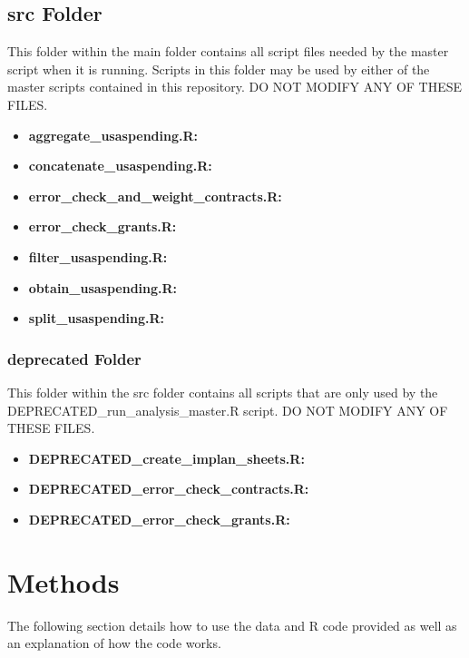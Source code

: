 \documentclass[
]{book}
\providecommand{\tightlist}{%
  \setlength{\itemsep}{0pt}\setlength{\parskip}{0pt}}
\begin{document}
\hypertarget{src-folder}{%
\section{src Folder}\label{src-folder}}

This folder within the main folder contains all script files needed by the master script when it is running. Scripts in this folder may be used by either of the master scripts contained in this repository. DO NOT MODIFY ANY OF THESE FILES.

\begin{itemize}
\tightlist
\item
  \textbf{aggregate\_usaspending.R:}
\item
  \textbf{concatenate\_usaspending.R:}
\item
  \textbf{error\_check\_and\_weight\_contracts.R:}
\item
  \textbf{error\_check\_grants.R:}
\item
  \textbf{filter\_usaspending.R:}
\item
  \textbf{obtain\_usaspending.R:}
\item
  \textbf{split\_usaspending.R:}
\end{itemize}

\hypertarget{deprecated-folder-1}{%
\subsection{deprecated Folder}\label{deprecated-folder-1}}

This folder within the src folder contains all scripts that are only used by the DEPRECATED\_run\_analysis\_master.R script. DO NOT MODIFY ANY OF THESE FILES.

\begin{itemize}
\tightlist
\item
  \textbf{DEPRECATED\_create\_implan\_sheets.R:}
\item
  \textbf{DEPRECATED\_error\_check\_contracts.R:}
\item
  \textbf{DEPRECATED\_error\_check\_grants.R:}
\end{itemize}

\hypertarget{methods}{%
\chapter{Methods}\label{methods}}

The following section details how to use the data and R code provided as well as an explanation of how the code works.
\end{document}
